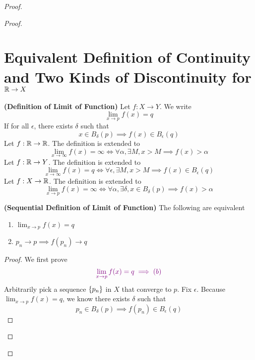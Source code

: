 \documentclass{report}
\begin{document}
\begin{proof}
\begin{proof}
\section{Equivalent Definition of Continuity and Two Kinds of Discontinuity for $\mathbb{R}\rightarrow X$}
\begin{definition}
\label{3.11.1}
\textbf{(Definition of Limit of Function)} Let $f:X\rightarrow Y$. We write 
\begin{equation*}
\lim_{x\to p}f(x)=q
\end{equation*}
If for all $\epsilon $, there exists $\delta$ such that 
\begin{equation*}
x \in B_\delta(p)\implies  f(x)\in B_{\epsilon }(q)
\end{equation*}
Let $f:\mathbb{R}\rightarrow \mathbb{R}$. The definition is extended to 
\begin{equation*}
\lim_{x\to \infty}f(x)=\infty \iff  \forall \alpha ,\exists M, x>M\implies f(x)>\alpha 
\end{equation*}
Let $f:\mathbb{R}\rightarrow Y$. The definition is extended to 
\begin{equation*}
\lim_{x\to \infty}f(x)=q\iff \forall \epsilon, \exists M, x>M\implies f(x)\in B_{\epsilon }(q)
\end{equation*}
Let $f:X\rightarrow \mathbb{R}$. The definition is extended to 
\begin{equation*}
\lim_{x\to p}f(x)=\infty \iff \forall \alpha , \exists \delta, x\in B_\delta(p)\implies f(x)>\alpha 
\end{equation*}
\end{definition}
\begin{theorem}
\label{3.11.2}
\textbf{(Sequential Definition of Limit of Function)} The following are equivalent
\begin{enumerate}[label=(\alph*)]
  \item $\lim_{x\to p}f(x)=q$
  \item $p_n\to p \implies f(p_n)\to q$
\end{enumerate}
\end{theorem}
\begin{proof}
We first prove 
\begin{equation*}
\textcolor{violet}{\lim_{x\to p}f(x)=q\implies (b)}
\end{equation*}
Arbitrarily pick a sequence $\{ p_n \}$ in $X$ that converge to $p$. Fix $\epsilon $. Because $\lim_{x\to p}f(x)=q$, we know there exists $\delta$ such that 
\begin{equation*}
p_n \in B_{\delta}(p)\implies f(p_n)\in B_\epsilon (q)
\end{equation*}

\end{proof}
\end{proof}
\end{proof}
\end{document}
